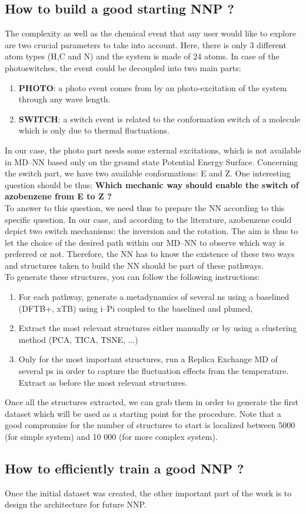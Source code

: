 \documentclass[12pt]{article}
\begin{document}
\subsection{How to build a good starting NNP ?}
The complexity as well as the chemical event that any user would like to explore are two crucial parameters to take into account. Here, there is only 3 different atom types (H,C and N) and the system is made of 24 atoms. In case of the photoswitches, the event could be decoupled into two main parts:
\begin{enumerate}
    \item \textbf{PHOTO}: a photo event comes from by an photo-excitation of the system through any wave length. 
    \item \textbf{SWITCH}: a switch event is related to the conformation switch of a molecule which is only due to thermal fluctuations.
\end{enumerate}
In our case, the photo part needs some external excitations, which is not available in MD--NN based only on the ground state Potential Energy Surface. Concerning the switch part, we have two available conformations: E and Z. One interesting question should be thus: \textbf{Which mechanic way should enable the switch of azobenzene from E to Z ?} \\
To answer to this question, we need thus to prepare the NN according to this specific question. In our case, and according to the literature, azobenzene could depict two switch mechanisms: the inversion and the rotation. The aim is thus to let the choice of the desired path within our MD--NN to observe which way is preferred or not. Therefore, the NN has to know the existence of these two ways and structures taken to build the NN should be part of these pathways. \\
To generate these structures, you can follow the following instructions:
\begin{enumerate}
    \item For each pathway, generate a metadynamics of several ns using a baselined (DFTB+, xTB) using i--Pi coupled to the baselined and plumed,
    \item Extract the most relevant structures either manually or by using a clustering method (PCA, TICA, TSNE, ...)
    \item Only for the most important structures, run a Replica Exchange MD of several ps in order to capture the fluctuation effects from the temperature. Extract as before the most relevant structures.
\end{enumerate}
Once all the structures extracted, we can grab them in order to generate the first dataset which will be used as a starting point for the procedure. Note that a good compromise for the number of structures to start is localized between 5000 (for simple system) and 10 000 (for more complex system). 
%
\subsection{How to efficiently train a good NNP ?}
Once the initial dataset was created, the other important part of the work is to design the architecture for future NNP.



\end{document}
